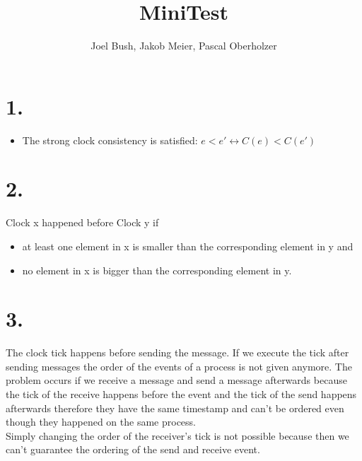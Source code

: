 \documentclass[10pt,a4paper]{article}
\author{Joel Bush, Jakob Meier, Pascal Oberholzer}
\title{MiniTest}
\begin{document}
	\maketitle
	
	\section*{1.}
		\begin{itemize}
			\item The strong clock consistency is satisfied: $e < e' \leftrightarrow C \left( e \right) < C \left( e' \right)$
		\end{itemize}
	
	\section*{2.}
		Clock x happened  before Clock y if
		\begin{itemize}
			\item at least one element in x is smaller than the corresponding element in y and
			\item no element in x is bigger than the corresponding element in y.
		\end{itemize}
	
	\section*{3.}
		The clock tick happens before sending the message. If we execute the tick after sending messages the order of the events of a process is not given anymore. The problem occurs if we receive a message and send a message afterwards because the tick of the receive happens before the event and the tick of the send happens afterwards therefore they have the same timestamp and can't be ordered even though they happened on the same process.\\
		Simply changing the order of the receiver's tick is not possible because then we can't guarantee the ordering of the send and receive event.
	
\end{document}
